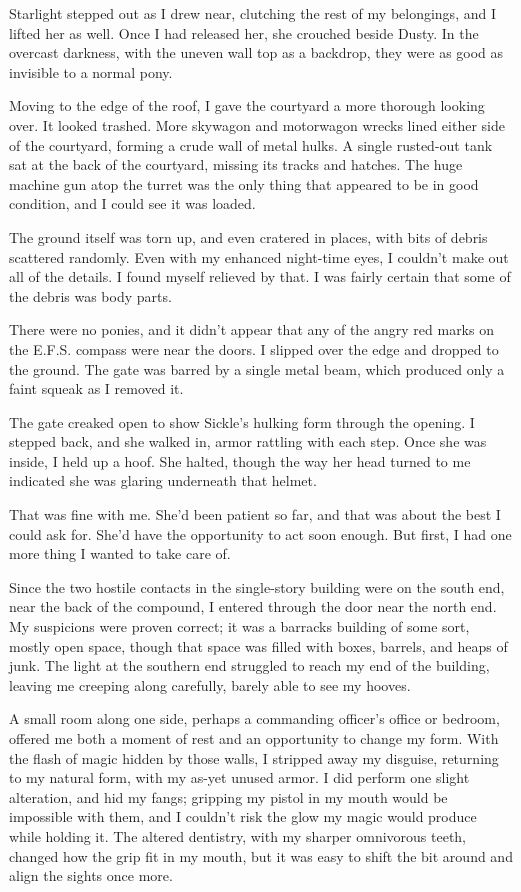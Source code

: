 Starlight stepped out as I drew near, clutching the rest of my belongings, and I lifted her as well. Once I had released her, she crouched beside Dusty. In the overcast darkness, with the uneven wall top as a backdrop, they were as good as invisible to a normal pony.

Moving to the edge of the roof, I gave the courtyard a more thorough looking over. It looked trashed. More skywagon and motorwagon wrecks lined either side of the courtyard, forming a crude wall of metal hulks. A single rusted-out tank sat at the back of the courtyard, missing its tracks and hatches. The huge machine gun atop the turret was the only thing that appeared to be in good condition, and I could see it was loaded.

The ground itself was torn up, and even cratered in places, with bits of debris scattered randomly. Even with my enhanced night-time eyes, I couldn’t make out all of the details. I found myself relieved by that. I was fairly certain that some of the debris was body parts.

There were no ponies, and it didn’t appear that any of the angry red marks on the E.F.S. compass were near the doors. I slipped over the edge and dropped to the ground. The gate was barred by a single metal beam, which produced only a faint squeak as I removed it.

The gate creaked open to show Sickle’s hulking form through the opening. I stepped back, and she walked in, armor rattling with each step. Once she was inside, I held up a hoof. She halted, though the way her head turned to me indicated she was glaring underneath that helmet.

That was fine with me. She’d been patient so far, and that was about the best I could ask for. She’d have the opportunity to act soon enough. But first, I had one more thing I wanted to take care of.

Since the two hostile contacts in the single-story building were on the south end, near the back of the compound, I entered through the door near the north end. My suspicions were proven correct; it was a barracks building of some sort, mostly open space, though that space was filled with boxes, barrels, and heaps of junk. The light at the southern end struggled to reach my end of the building, leaving me creeping along carefully, barely able to see my hooves.

A small room along one side, perhaps a commanding officer’s office or bedroom, offered me both a moment of rest and an opportunity to change my form. With the flash of magic hidden by those walls, I stripped away my disguise, returning to my natural form, with my as-yet unused armor. I did perform one slight alteration, and hid my fangs; gripping my pistol in my mouth would be impossible with them, and I couldn’t risk the glow my magic would produce while holding it. The altered dentistry, with my sharper omnivorous teeth, changed how the grip fit in my mouth, but it was easy to shift the bit around and align the sights once more.

